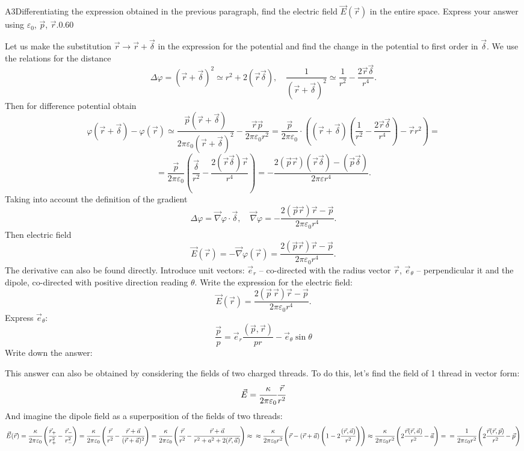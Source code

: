 \documentclass[11pt,a4paper]{article}
\begin{document}
\begin{solcard}{A3}{Differentiating the expression obtained in the previous paragraph, find the electric field $\vec{E}(\vec{r})$ in the entire space. Express your answer using $\varepsilon_0$, $\vec p$, $\vec{r}$.}{0.60}

Let us make the substitution $\vec{r} \to \vec{r} + \vec{\delta}$ in the expression for the potential and find the change in the potential to first order in $\vec{\delta}$. We use the relations for the distance $$ \Delta \varphi = (\vec{r} + \vec{\delta})^2 \simeq r^2 + 2 (\vec{r} \vec{\delta}), \quad \frac{1}{(\vec{r} + \vec{\delta})^2}\simeq \frac{1}{r^2} - \frac{2 \vec{r} \vec{\delta}}{r^4}. $$Then for difference potential obtain $$ \varphi(\vec{r} + \vec{\delta}) - \varphi(\vec{r}) \simeq \frac{\vec{p} (\vec{r} + \vec{\delta})}{2 \pi \varepsilon_0 (\vec{r}  + \vec{\delta})^2} - \dfrac{ \vec r \vec p}{2\pi\varepsilon_0 r^2} = \frac{\vec{p}}{2\pi \varepsilon_0} \cdot\left( (\vec{r} + \vec{\delta} )\left(\frac{1}{r^2}  - \frac{2 \vec{r} \vec{\delta}}{r^4}\right) - \vec{r}{r^2} \right)=$$ $$= \frac{\vec{p}}{2 \pi \varepsilon_0}\left(\frac{\vec{\delta}}{r^2} - \frac{2(\vec{r} \vec{\delta})\vec{r}}{r^4} \right) = - \frac{2(\vec{p} \vec{r})(\vec{r} \vec{\delta}) - (\vec{p}{\vec{\delta}})}{2 \pi \varepsilon r^4}. $$Taking into account the definition of the gradient $$ \Delta \varphi = \vec{\nabla} \varphi \cdot \vec{\delta}, \quad \vec{\nabla} \varphi = - \frac{2(\vec{p} \vec{r})\vec{r}  -\vec{p} }{2 \pi \varepsilon_0 r^4}. $$Then electric field $$ \vec{E}(\vec{r}) = - \vec{\nabla} \varphi (\vec{r}) =   \frac{2(\vec{p} \vec{r})\vec{r}  -\vec{p} }{2 \pi \varepsilon_0 r^4}. $$ The derivative can also be found directly. Introduce unit vectors: $\vec e_r$ -- co-directed with the radius vector $\vec r$, $\vec e_{\theta}$ – perpendicular it and the dipole, co-directed with positive direction reading $\theta$. Write the expression for the electric field: $$\vec{E}(\vec{r}) = \frac{2(\vec{p}\,\vec{r})\vec{r} - \vec{p}}{2\pi\varepsilon_0 r^4}.$$ Express $\vec e_{\theta}$: \[\dfrac{\vec p}{p}=\vec e_r\dfrac{(\vec p,\vec r)}{pr}-\vec e_{\theta}\sin\theta\]Write down the answer:


This answer can also be obtained by considering the fields of two charged threads. To do this, let’s find the field of 1 thread in vector form: \[\vec{E} = \cfrac{\kappa}{2\pi \varepsilon_0}\cfrac{\vec{r}}{r^2}\]And imagine the dipole field as a superposition of the fields of two threads: \[\vec{E}(\vec{r}) = \cfrac{\kappa}{2\pi\varepsilon_0}\left(\cfrac{\vec{r}_+}{r_+^2} - \cfrac{\vec{r}_-}{r_-^2}\right) = \cfrac{\kappa}{2\pi\varepsilon_0}\left(\cfrac{\vec{r}}{r^2} - \cfrac{\vec{r} + \vec{a}}{(\vec{r} + \vec{a})^2}\right)=\cfrac{\kappa}{2\pi\varepsilon_0}\left(\cfrac{\vec{r}}{r^2} - \cfrac{\vec{r} + \vec{a}}{r^2 + a^2+2(\vec{r}, \vec{a})}\right)\approx\\ \approx\cfrac{\kappa}{2\pi\varepsilon_0r^2}\left(\vec{r} - (\vec{r} + \vec{a})\left(1 - 2\cfrac{(\vec{r},\vec{a})}{r^2}\right)\right) \approx \cfrac{\kappa}{2\pi\varepsilon_0r^2}\left( 2\cfrac{\vec{r}(\vec{r},\vec{a})}{r^2} - \vec{a}\right) = \\ = \cfrac{1}{2\pi\varepsilon_0r^2}\left( 2\cfrac{\vec{r}(\vec{r},\vec{p})}{r^2} - \vec{p}\right)\]


\end{solcard}
\end{document}
